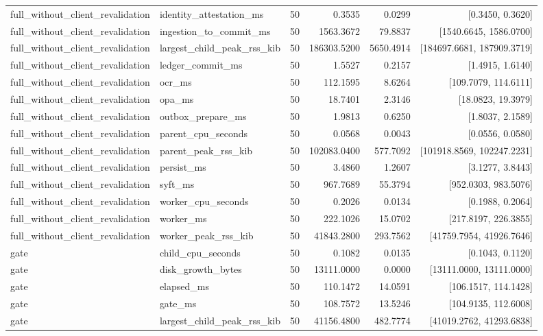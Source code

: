 \begin{tabular}{llrrrr}
full\_without\_client\_revalidation & identity\_attestation\_ms & 50 & 0.3535 & 0.0299 & [0.3450, 0.3620] \\
full\_without\_client\_revalidation & ingestion\_to\_commit\_ms & 50 & 1563.3672 & 79.8837 & [1540.6645, 1586.0700] \\
full\_without\_client\_revalidation & largest\_child\_peak\_rss\_kib & 50 & 186303.5200 & 5650.4914 & [184697.6681, 187909.3719] \\
full\_without\_client\_revalidation & ledger\_commit\_ms & 50 & 1.5527 & 0.2157 & [1.4915, 1.6140] \\
full\_without\_client\_revalidation & ocr\_ms & 50 & 112.1595 & 8.6264 & [109.7079, 114.6111] \\
full\_without\_client\_revalidation & opa\_ms & 50 & 18.7401 & 2.3146 & [18.0823, 19.3979] \\
full\_without\_client\_revalidation & outbox\_prepare\_ms & 50 & 1.9813 & 0.6250 & [1.8037, 2.1589] \\
full\_without\_client\_revalidation & parent\_cpu\_seconds & 50 & 0.0568 & 0.0043 & [0.0556, 0.0580] \\
full\_without\_client\_revalidation & parent\_peak\_rss\_kib & 50 & 102083.0400 & 577.7092 & [101918.8569, 102247.2231] \\
full\_without\_client\_revalidation & persist\_ms & 50 & 3.4860 & 1.2607 & [3.1277, 3.8443] \\
full\_without\_client\_revalidation & syft\_ms & 50 & 967.7689 & 55.3794 & [952.0303, 983.5076] \\
full\_without\_client\_revalidation & worker\_cpu\_seconds & 50 & 0.2026 & 0.0134 & [0.1988, 0.2064] \\
full\_without\_client\_revalidation & worker\_ms & 50 & 222.1026 & 15.0702 & [217.8197, 226.3855] \\
full\_without\_client\_revalidation & worker\_peak\_rss\_kib & 50 & 41843.2800 & 293.7562 & [41759.7954, 41926.7646] \\
gate & child\_cpu\_seconds & 50 & 0.1082 & 0.0135 & [0.1043, 0.1120] \\
gate & disk\_growth\_bytes & 50 & 13111.0000 & 0.0000 & [13111.0000, 13111.0000] \\
gate & elapsed\_ms & 50 & 110.1472 & 14.0591 & [106.1517, 114.1428] \\
gate & gate\_ms & 50 & 108.7572 & 13.5246 & [104.9135, 112.6008] \\
gate & largest\_child\_peak\_rss\_kib & 50 & 41156.4800 & 482.7774 & [41019.2762, 41293.6838] \\

\end{tabular}
